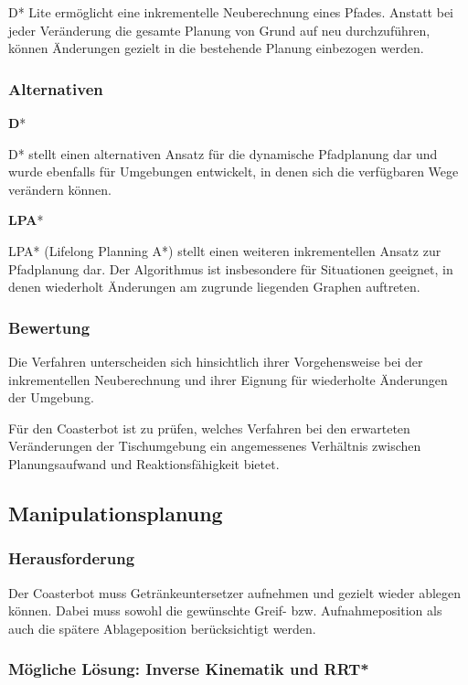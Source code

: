 \documentclass[
  a4paper,
  12pt,
  DIV=12,        %
  parskip=half,  %
  headings=small %
]{scrartcl}
\theoremstyle{definition}
\theoremstyle{definition}
\begin{document}
D* Lite ermöglicht eine inkrementelle Neuberechnung eines Pfades.
Anstatt bei jeder Veränderung die gesamte Planung von Grund auf neu
durchzuführen, können Änderungen gezielt in die bestehende Planung
einbezogen werden.

\subsubsection{Alternativen}\label{alternativen-2}

\textbf{D}*

D* stellt einen alternativen Ansatz für die dynamische Pfadplanung dar
und wurde ebenfalls für Umgebungen entwickelt, in denen sich die
verfügbaren Wege verändern können.

\textbf{LPA}*

LPA* (Lifelong Planning A*) stellt einen weiteren inkrementellen Ansatz
zur Pfadplanung dar. Der Algorithmus ist insbesondere für Situationen
geeignet, in denen wiederholt Änderungen am zugrunde liegenden Graphen
auftreten.

\subsubsection{Bewertung}\label{bewertung-2}

Die Verfahren unterscheiden sich hinsichtlich ihrer Vorgehensweise bei
der inkrementellen Neuberechnung und ihrer Eignung für wiederholte
Änderungen der Umgebung.

Für den Coasterbot ist zu prüfen, welches Verfahren bei den erwarteten
Veränderungen der Tischumgebung ein angemessenes Verhältnis zwischen
Planungsaufwand und Reaktionsfähigkeit bietet.

\subsection{Manipulationsplanung}\label{manipulationsplanung}

\subsubsection{Herausforderung}\label{herausforderung-3}

Der Coasterbot muss Getränkeuntersetzer aufnehmen und gezielt wieder
ablegen können. Dabei muss sowohl die gewünschte Greif- bzw.
Aufnahmeposition als auch die spätere Ablageposition berücksichtigt
werden.

\subsubsection{Mögliche Lösung: Inverse Kinematik und
RRT*}\label{muxf6gliche-luxf6sung-inverse-kinematik-und-rrt}
\end{document}
